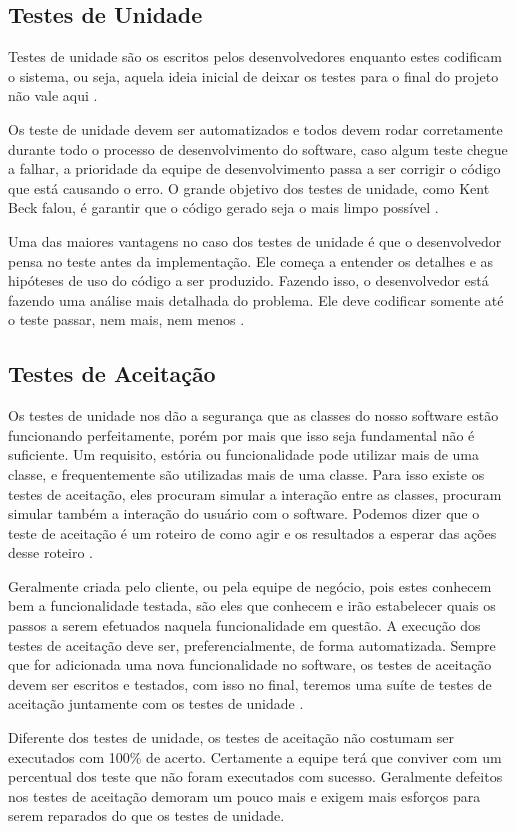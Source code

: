 \documentclass[pnumabnt,normaltoc,espacoumemeio,capchap]{abnt}
\begin{document}
\subsection{Testes de Unidade}
\par Testes de unidade são os escritos pelos desenvolvedores enquanto estes codificam o sistema, ou seja, aquela ideia inicial de deixar os testes para o final do projeto não vale aqui \cite{TL04}.
\par Os teste de unidade devem ser automatizados e todos devem rodar corretamente durante todo o processo de desenvolvimento do software, caso algum teste chegue a falhar, a prioridade da equipe de desenvolvimento passa a ser corrigir o código que está causando o erro. O grande objetivo dos testes de unidade, como Kent Beck falou, é garantir que o código gerado seja o mais limpo possível \cite{TL04}.
\par Uma das maiores vantagens no caso dos testes de unidade é que o desenvolvedor pensa no teste antes da implementação. Ele começa a entender os detalhes e as hipóteses de uso do código a ser produzido. Fazendo isso, o desenvolvedor está fazendo uma análise mais detalhada do problema. Ele deve codificar somente até o teste passar, nem mais, nem menos \cite{TL04}.
\subsection{Testes de Aceitação}
\par Os testes de unidade nos dão a segurança que as classes do nosso software estão funcionando perfeitamente, porém por mais que isso seja fundamental não é suficiente. Um requisito, estória ou funcionalidade pode utilizar mais de uma classe, e frequentemente são utilizadas mais de uma classe. Para isso existe os testes de aceitação, eles procuram simular a interação entre as classes, procuram simular também a interação do usuário com o software. Podemos dizer que o teste de aceitação é um roteiro de como agir e os resultados a esperar das ações desse roteiro \cite{TL04}.
\par Geralmente criada pelo cliente, ou pela equipe de negócio, pois estes conhecem bem a funcionalidade testada, são eles que conhecem e irão estabelecer quais os passos a serem efetuados naquela funcionalidade em questão. A execução dos testes de aceitação deve ser, preferencialmente, de forma automatizada. Sempre que for adicionada uma nova funcionalidade no software, os testes de aceitação devem ser escritos e testados, com isso no final, teremos uma suíte de testes de aceitação juntamente com os testes de unidade \cite{TL04}.
\par Diferente dos testes de unidade, os testes de aceitação não costumam ser executados com 100\% de acerto. Certamente a equipe terá que conviver com um percentual dos teste que não foram executados com sucesso. Geralmente defeitos nos testes de aceitação demoram um pouco mais e exigem mais esforços para serem reparados do que os testes de unidade.
\end{document}
